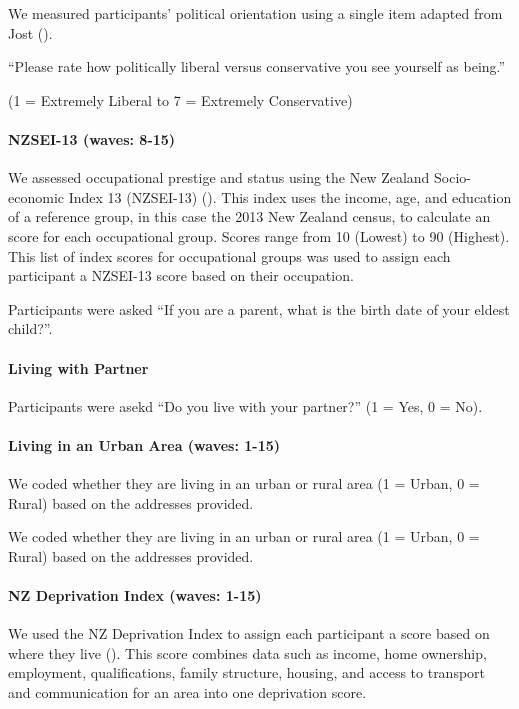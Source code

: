 \documentclass[
  singlecolumn]{article}
\let\oldparagraph\paragraph
\renewcommand{\paragraph}[1]{\oldparagraph{#1}\mbox{}}
\begin{document}
We measured participants' political orientation using a single item
adapted from Jost ().

``Please rate how politically liberal versus conservative you see
yourself as being.''

(1 = Extremely Liberal to 7 = Extremely Conservative)

\paragraph{NZSEI-13 (waves: 8-15)}\label{nzsei-13-waves-8-15}

We assessed occupational prestige and status using the New Zealand
Socio-economic Index 13 (NZSEI-13) (). This index uses the income, age, and education of
a reference group, in this case the 2013 New Zealand census, to
calculate an score for each occupational group. Scores range from 10
(Lowest) to 90 (Highest). This list of index scores for occupational
groups was used to assign each participant a NZSEI-13 score based on
their occupation.

Participants were asked ``If you are a parent, what is the birth date of
your eldest child?''.

\paragraph{Living with Partner}\label{living-with-partner}

Participants were asekd ``Do you live with your partner?'' (1 = Yes, 0 =
No).

\paragraph{Living in an Urban Area (waves:
1-15)}\label{living-in-an-urban-area-waves-1-15}

We coded whether they are living in an urban or rural area (1 = Urban, 0
= Rural) based on the addresses provided.

We coded whether they are living in an urban or rural area (1 = Urban, 0
= Rural) based on the addresses provided.

\paragraph{NZ Deprivation Index (waves:
1-15)}\label{nz-deprivation-index-waves-1-15}

We used the NZ Deprivation Index to assign each participant a score
based on where they live (). This score combines data such as income, home ownership,
employment, qualifications, family structure, housing, and access to
transport and communication for an area into one deprivation score.
\end{document}
